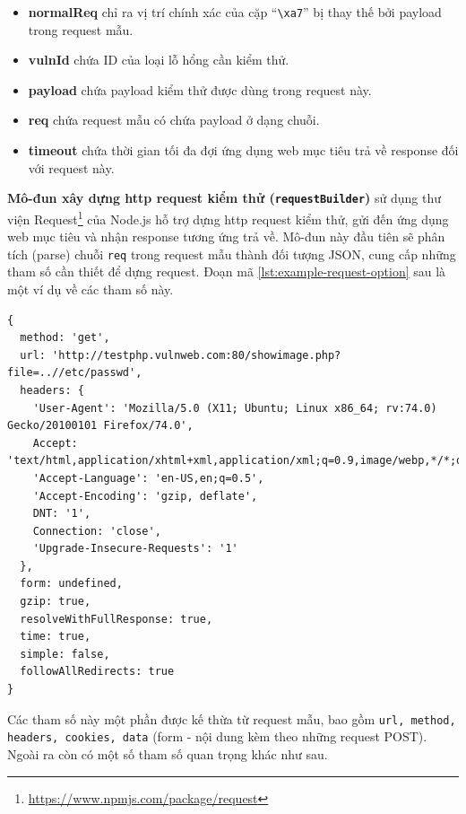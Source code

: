 \begin{itemize}
    \item \textbf{normalReq} chỉ ra vị trí chính xác của cặp ``\texttt{\textbackslash xa7}'' bị thay thế bởi payload trong request mẫu.
    \item \textbf{vulnId} chứa ID của loại lỗ hổng cần kiểm thử.
    \item \textbf{payload} chứa payload kiểm thử được dùng trong request này.
    \item \textbf{req} chứa request mẫu có chứa payload ở dạng chuỗi.
    \item \textbf{timeout} chứa thời gian tối đa đợi ứng dụng web mục tiêu trả về response đối với request này.
\end{itemize}
\textbf{Mô-đun xây dựng \acrshort{http} request kiểm thử (\texttt{requestBuilder})} sử dụng thư viện Request\footnote{\href{https://www.npmjs.com/package/request}{https://www.npmjs.com/package/request}} của Node.js hỗ trợ dựng \acrshort{http} request kiểm thử, gửi đến ứng dụng web mục tiêu và nhận response tương ứng trả về. Mô-đun này đầu tiên sẽ phân tích (parse) chuỗi \texttt{req} trong request mẫu thành đối tượng JSON, cung cấp những tham số cần thiết để dựng request. Đoạn mã \ref{lst:example-request-option} sau là một ví dụ về các tham số này.
\begin{lstlisting}[style=ES6, label={lst:example-request-option}, caption={Ví dụ về tham số xây dựng request kiểm thử}]
{ 
  method: 'get',
  url: 'http://testphp.vulnweb.com:80/showimage.php?file=..//etc/passwd',
  headers: { 
    'User-Agent': 'Mozilla/5.0 (X11; Ubuntu; Linux x86_64; rv:74.0) Gecko/20100101 Firefox/74.0',
    Accept: 'text/html,application/xhtml+xml,application/xml;q=0.9,image/webp,*/*;q=0.8',
    'Accept-Language': 'en-US,en;q=0.5',
    'Accept-Encoding': 'gzip, deflate',
    DNT: '1',
    Connection: 'close',
    'Upgrade-Insecure-Requests': '1' 
  },
  form: undefined,
  gzip: true,
  resolveWithFullResponse: true,
  time: true,
  simple: false,
  followAllRedirects: true
}
\end{lstlisting}
Các tham số này một phần được kế thừa từ request mẫu, bao gồm \texttt{url, method, headers, cookies, data} (form - nội dung kèm theo những request POST). Ngoài ra còn có một số tham số quan trọng khác như sau.
